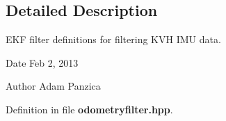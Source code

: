 \subsection{\-Detailed \-Description}
\-E\-K\-F filter definitions for filtering \-K\-V\-H \-I\-M\-U data. \begin{DoxyDate}{\-Date}
\-Feb 2, 2013 
\end{DoxyDate}
\begin{DoxyAuthor}{\-Author}
\-Adam \-Panzica 
\end{DoxyAuthor}


\-Definition in file {\bf odometryfilter.\-hpp}.

